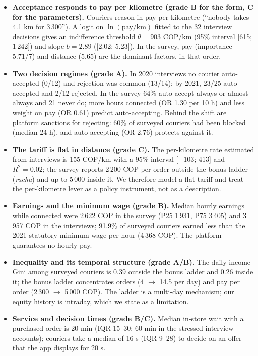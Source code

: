 \documentclass[preprint,12pt,authoryear]{elsarticle}%
\begin{document}
\begin{itemize}
\item \textbf{Acceptance responds to pay per kilometre (grade B for the form, C for the parameters).} Couriers reason in pay per kilometre (``nobody takes 4.1 km for 3\,300''). A logit on $\ln(\text{pay/km})$ fitted to the 32 interview decisions gives an indifference threshold $\theta = 903$ COP/km (95\% interval [615; 1\,242]) and slope $b = 2.89$ ([2.02; 5.23]). In the survey, pay (importance 5.71/7) and distance (5.65) are the dominant factors, in that order.
\item \textbf{Two decision regimes (grade A).} In 2020 interviews no courier auto-accepted (0/12) and rejection was common (13/14); by 2021, 23/25 auto-accepted and 2/12 rejected. In the survey 64\% auto-accept always or almost always and 21 never do; more hours connected (OR 1.30 per 10 h) and less weight on pay (OR 0.61) predict auto-accepting. Behind the shift are platform sanctions for rejecting: 60\% of surveyed couriers had been blocked (median 24 h), and auto-accepting (OR 2.76) protects against it.
\item \textbf{The tariff is flat in distance (grade C).} The per-kilometre rate estimated from interviews is 155 COP/km with a 95\% interval [$-103$; 413] and $R^2 = 0.02$; the survey reports 2\,200 COP per order outside the bonus ladder (\emph{racha}) and up to 5\,000 inside it. We therefore model a flat tariff and treat the per-kilometre lever as a policy instrument, not as a description.
\item \textbf{Earnings and the minimum wage (grade B).} Median hourly earnings while connected were 2\,622 COP in the survey (P25 1\,931, P75 3\,405) and 3\,957 COP in the interviews; 91.9\% of surveyed couriers earned less than the 2021 statutory minimum wage per hour (4\,368 COP). The platform guarantees no hourly pay.
\item \textbf{Inequality and its temporal structure (grade A/B).} The daily-income Gini among surveyed couriers is 0.39 outside the bonus ladder and 0.26 inside it; the bonus ladder concentrates orders (4 $\to$ 14.5 per day) and pay per order (2\,300 $\to$ 5\,000 COP). The ladder is a multi-day mechanism; our equity history is intraday, which we state as a limitation.
\item \textbf{Service and decision times (grade B/C).} Median in-store wait with a purchased order is 20 min (IQR 15--30; 60 min in the stressed interview accounts); couriers take a median of 16 s (IQR 9--28) to decide on an offer that the app displays for 20 s.
\end{itemize}
\end{document}
